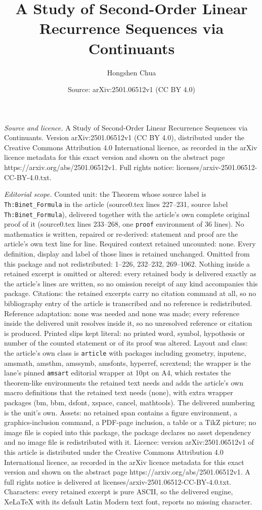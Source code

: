 \documentclass[10pt,a4paper]{amsart}
\title[A Study of Second-Order Linear Recurrence Sequences via Cont]{A Study of Second-Order Linear Recurrence Sequences via Continuants}
\author{Hongshen Chua}
\date{Source: arXiv:2501.06512v1 (CC BY 4.0)}
\begin{document}
\maketitle

\noindent\emph{Source and licence.} A Study of Second-Order Linear Recurrence Sequences via Continuants. Version arXiv:2501.06512v1 (CC BY 4.0), distributed under the Creative Commons Attribution 4.0 International licence, as recorded in the arXiv licence metadata for this exact version and shown on the abstract page https://arxiv.org/abs/2501.06512v1. Full rights notice: licenses/arxiv-2501.06512-CC-BY-4.0.txt.\par\smallskip

\noindent\textit{Editorial scope.} Counted unit: the Theorem whose source label is \texttt{Th:Binet\_Formula} in the article (source0.tex lines 227--231, source label \texttt{Th:Binet\_Formula}), delivered together with the article's own complete original proof of it (source0.tex lines 233--268, one \texttt{proof} environment of 36 lines). No mathematics is written, repaired or re-derived: statement and proof are the article's own text line for line. Required context retained uncounted: none. Every definition, display and label of those lines is retained unchanged. Omitted from this package and not redistributed: 1--226, 232--232, 269--1062. Nothing inside a retained excerpt is omitted or altered: every retained body is delivered exactly as the article's lines are written, so no omission receipt of any kind accompanies this package. Citations: the retained excerpts carry no citation command at all, so no bibliography entry of the article is transcribed and no reference is redistributed. Reference adaptation: none was needed and none was made; every reference inside the delivered unit resolves inside it, so no unresolved reference or citation is produced. Printed slips kept literal: no printed word, symbol, hypothesis or number of the counted statement or of its proof was altered. Layout and class: the article's own class is \texttt{article} with packages including geometry, inputenc, amsmath, amsthm, amssymb, amsfonts, hyperref, scrextend; the wrapper is the lane's pinned \texttt{amsart} editorial wrapper at 10pt on A4, which restates the theorem-like environments the retained text needs and adds the article's own macro definitions that the retained text needs (none), with extra wrapper packages (bm, bbm, dsfont, xspace, cancel, mathtools). The delivered numbering is the unit's own. Assets: no retained span contains a figure environment, a graphics-inclusion command, a PDF-page inclusion, a table or a TikZ picture; no image file is copied into this package, the package declares no asset dependency and no image file is redistributed with it. Licence: version arXiv:2501.06512v1 of this article is distributed under the Creative Commons Attribution 4.0 International licence, as recorded in the arXiv licence metadata for this exact version and shown on the abstract page https://arxiv.org/abs/2501.06512v1. A full rights notice is delivered at licenses/arxiv-2501.06512-CC-BY-4.0.txt. Characters: every retained excerpt is pure ASCII, so the delivered engine, XeLaTeX with its default Latin Modern text font, reports no missing character.
\end{document}
